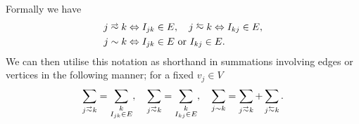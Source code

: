 Formally we have
\begin{align*}
	j\conLeft k &\Leftrightarrow I_{jk}\in E, \quad
	j\conRight k \Leftrightarrow I_{kj}\in E, \\
	j\con k &\Leftrightarrow I_{jk}\in E \text{ or } I_{kj}\in E.
\end{align*}
We can then utilise this notation as shorthand in summations involving edges or vertices in the following manner; for a fixed $v_j\in V$
\begin{align*}
	\sum_{j\conLeft k} = \sum_{\substack{k \\ I_{jk}\in E}}, \quad
	\sum_{j\conLeft k} = \sum_{\substack{k \\ I_{kj}\in E}}, \quad
	\sum_{j\con k} = \sum_{j\conLeft k} + \sum_{j\conRight k}.
\end{align*}

